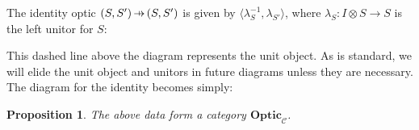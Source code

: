 \documentclass[11pt,a4paper]{article}
\theoremstyle{plain}
\newtheorem{proposition}[theorem]{Proposition}
\theoremstyle{definition}
\newcommand{\C}{\mathscr{C}}
\newcommand{\Optic}{\mathbf{Optic}}
\newcommand{\hto}{\ensuremath{\,\mathaccent\shortmid\rightarrow\,}}
\begin{document}
The identity optic $(S, S') \hto (S, S')$ is given by $\langle \lambda^{-1}_S, \lambda_{S'} \rangle$, where $\lambda_S : I \otimes S \to S$ is the left unitor for $S$: 
\begin{center}

\end{center}
This dashed line above the diagram represents the unit object. As is standard, we will elide the unit object and unitors in future diagrams unless they are necessary. The diagram for the identity becomes simply:
\begin{center}

\end{center}

\begin{proposition}
The above data form a category $\Optic_\C$.
\end{proposition}
\end{document}
